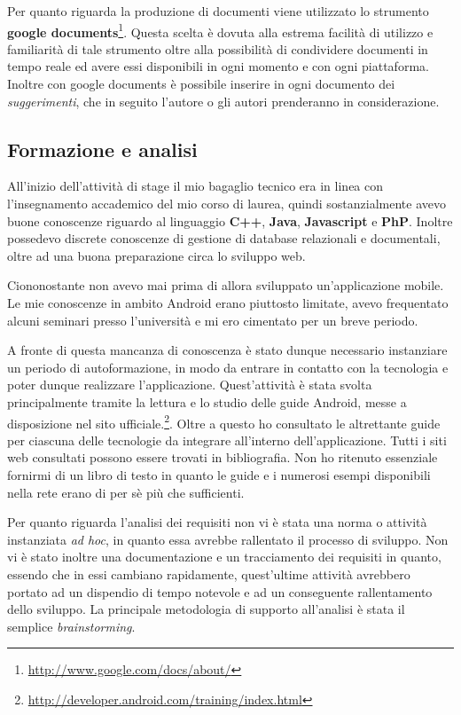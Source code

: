 Per quanto riguarda la produzione di documenti viene utilizzato lo strumento \textbf{google documents}\footnote{\url{http://www.google.com/docs/about/}}. Questa scelta è dovuta alla estrema facilità di utilizzo e familiarità di tale strumento oltre alla possibilità di condividere documenti in tempo reale ed avere essi disponibili in ogni momento e con ogni piattaforma. Inoltre con google documents è possibile inserire in ogni documento dei \textit{suggerimenti}, che in seguito l'autore o gli autori prenderanno in considerazione.

\subsection*{Formazione e analisi}

All'inizio dell'attività di stage il mio bagaglio tecnico era in linea con l'insegnamento accademico del mio corso di laurea, quindi sostanzialmente avevo buone conoscenze riguardo al linguaggio \textbf{C++}, \textbf{Java}, \textbf{Javascript} e \textbf{PhP}. Inoltre possedevo discrete conoscenze di gestione di database relazionali e documentali, oltre ad una buona preparazione circa lo sviluppo web.

Ciononostante non avevo mai prima di allora sviluppato un'applicazione mobile. Le mie conoscenze in ambito Android erano piuttosto limitate, avevo frequentato alcuni seminari presso l'università e mi ero cimentato per un breve periodo.

A fronte di questa mancanza di conoscenza è stato dunque necessario instanziare un periodo di autoformazione, in modo da entrare in contatto con la tecnologia e poter dunque realizzare l'applicazione. Quest'attività è stata svolta principalmente tramite la lettura e lo studio delle guide Android, messe a disposizione nel sito ufficiale.\footnote{\url{http://developer.android.com/training/index.html}}. Oltre a questo ho consultato le altrettante guide per ciascuna delle tecnologie da integrare all'interno dell'applicazione. Tutti i siti web consultati possono essere trovati in bibliografia. Non ho ritenuto essenziale fornirmi di un libro di testo in quanto le guide e i numerosi esempi disponibili nella rete erano di per sè più che sufficienti.

Per quanto riguarda l'analisi dei requisiti non vi è stata una norma o attività instanziata \textit{ad hoc}, in quanto essa avrebbe rallentato il processo di sviluppo. Non vi è stato inoltre una documentazione e un tracciamento dei requisiti in quanto, essendo che in essi cambiano rapidamente, quest'ultime attività avrebbero portato ad un dispendio di tempo notevole e ad un conseguente rallentamento dello sviluppo. La principale metodologia di supporto all'analisi è stata il semplice \textit{brainstorming}.

